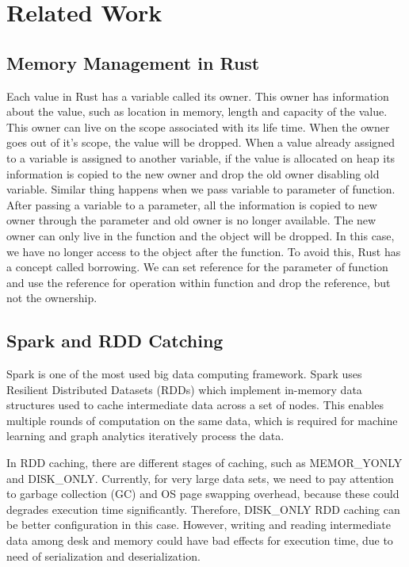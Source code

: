 \chapter{Related Work}
\label{chapter:relatedwork}
\thispagestyle{myheadings}

\graphicspath{{2_RelatedWork/Figures/}}

\section{Memory Management in Rust}
\label{sec:history}

Each value in Rust has a variable called its owner. This owner has information about the value, such as location in memory, 
length and capacity of the value. This owner can live on the scope associated with its life time. When the owner goes out of it’s scope, 
the value will be dropped. When a value already assigned to a variable is assigned to another variable, if the value is allocated 
on heap its information is copied to the new owner and drop the old owner disabling old variable. Similar thing happens when we pass variable to parameter of function. 
After passing a variable to a parameter, all the information is copied to new owner through the parameter and old owner is no longer available. 
The new owner can only live in the function and the object will be dropped. In this case, we have no longer access to the object after the function. 
To avoid this, Rust has a concept called borrowing. We can set reference for the parameter of function and use the reference for operation within function and drop the reference, 
but not the ownership. 


\section{Spark and RDD Catching}
\label{sec:history}

Spark is one of the most used big data computing framework. Spark uses Resilient Distributed Datasets (RDDs) which implement in-memory data structures 
used to cache intermediate data across a set of nodes. This enables multiple rounds of computation on the same data, which is required for machine learning 
and graph analytics iteratively process the data. 

In RDD caching, there are different stages of caching, such as MEMOR\_YONLY and DISK\_ONLY. 
Currently, for very large data sets, we need to pay attention to garbage collection (GC) and OS page swapping overhead, 
because these could degrades execution time significantly. Therefore, DISK\_ONLY RDD caching can be better configuration in this case. 
However, writing and reading intermediate data among desk and memory could have bad effects for execution time, due to need of serialization and deserialization. 


